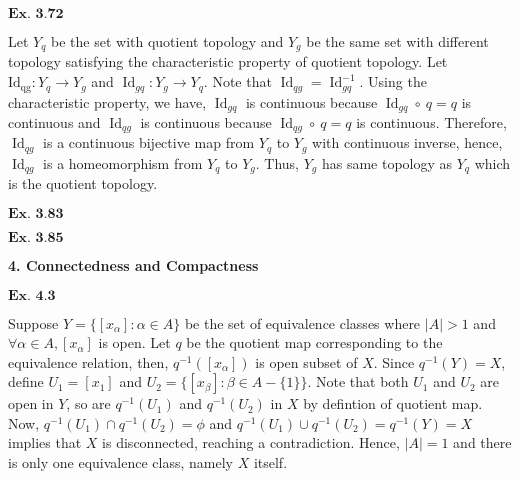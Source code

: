 \documentclass{article}
\begin{document}
${\textbf{Ex. 3.72}}$

Let $Y_q$ be the set with quotient topology and $Y_g$ be the same set with different topology satisfying the characteristic property of quotient topology. Let $\operatorname{Id_{qg}}:Y_q \rightarrow Y_g$ and $\operatorname{Id}_{gq}: Y_{g}\rightarrow Y_{q}$. Note that $\operatorname{Id}_{qg} = \operatorname{Id}_{gq}^{-1}$. Using the characteristic property, we have, $\operatorname{Id}_{gq}$ is continuous because $\operatorname{Id}_{gq} \circ\ q = q$ is continuous and $\operatorname{Id}_{qg}$ is continuous because $\operatorname{Id}_{qg} \circ\ q = q$ is continuous. Therefore, $\operatorname{Id}_{qg}$ is a continuous bijective map from $Y_q$ to $Y_g$ with continuous inverse, hence, $\operatorname{Id}_{qg}$ is a homeomorphism from $Y_q$ to $Y_g$. Thus, $Y_g$ has same topology as $Y_q$ which is the quotient topology.

\vspace{0.2in}

${\textbf{Ex. 3.83}}$


\vspace{0.2in}

${\textbf{Ex. 3.85}}$


\vspace{0.2in}
\clearpage


\begin{center}
    \textbf{\large{4. Connectedness and Compactness}}
\end{center}

${\textbf{Ex. 4.3}}$

Suppose $Y=\{[x_{\alpha}]:\alpha \in A\}$ be the set of equivalence classes where $|A|>1$ and $\forall \alpha \in A, [x_{\alpha}]$ is open. Let $q$ be the quotient map corresponding to the equivalence relation, then, $q^{-1}([x_{\alpha}])$ is open subset of $X$. Since $q^{-1}(Y) = X$, define $U_1 = [x_{1}]$ and $U_2 = \{[x_{\beta}]:\beta \in A-\{1\}\}$. Note that both $U_1$ and $U_2$ are open in $Y$, 
 so are $q^{-1}(U_1)$ and $q^{-1}(U_2)$ in $X$ by defintion of quotient map. Now, $q^{-1}(U_1) \cap q^{-1}(U_2) = \phi$ and $q^{-1}(U_1) \cup q^{-1}(U_2) = q^{-1}(Y) = X$ implies that $X$ is disconnected, reaching a contradiction. Hence, $|A| = 1$ and there is only one equivalence class, namely $X$ itself.
\end{document}
